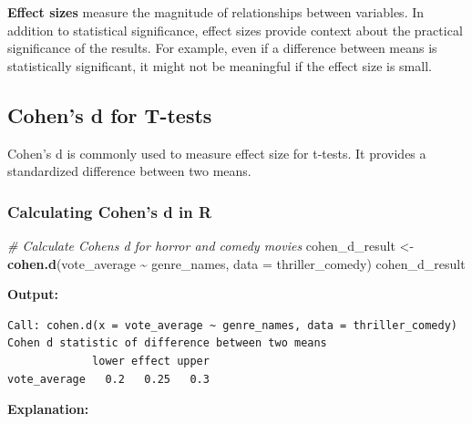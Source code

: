 \documentclass[
]{book}
\newenvironment{Shaded}{\begin{snugshade}}{\end{snugshade}}
\newcommand{\AttributeTok}[1]{\textcolor[rgb]{0.13,0.29,0.53}{#1}}
\newcommand{\CommentTok}[1]{\textcolor[rgb]{0.56,0.35,0.01}{\textit{#1}}}
\newcommand{\FunctionTok}[1]{\textcolor[rgb]{0.13,0.29,0.53}{\textbf{#1}}}
\newcommand{\NormalTok}[1]{#1}
\newcommand{\OtherTok}[1]{\textcolor[rgb]{0.56,0.35,0.01}{#1}}
\newcommand{\SpecialCharTok}[1]{\textcolor[rgb]{0.81,0.36,0.00}{\textbf{#1}}}
\begin{document}
\textbf{Effect sizes} measure the magnitude of relationships between variables. In addition to statistical significance, effect sizes provide context about the practical significance of the results. For example, even if a difference between means is statistically significant, it might not be meaningful if the effect size is small.

\subsection*{Cohen's d for T-tests}\label{cohens-d-for-t-tests}

Cohen's d is commonly used to measure effect size for t-tests. It provides a standardized difference between two means.

\subsubsection*{Calculating Cohen's d in R}\label{calculating-cohens-d-in-r}

\begin{Shaded}
\begin{Highlighting}[]
\CommentTok{\# Calculate Cohen\textquotesingle{}s d for horror and comedy movies}
\NormalTok{cohen\_d\_result }\OtherTok{\textless{}{-}} \FunctionTok{cohen.d}\NormalTok{(vote\_average }\SpecialCharTok{\textasciitilde{}}\NormalTok{ genre\_names, }\AttributeTok{data =}\NormalTok{ thriller\_comedy)}
\NormalTok{cohen\_d\_result}
\end{Highlighting}
\end{Shaded}

\textbf{Output:}

\begin{verbatim}
Call: cohen.d(x = vote_average ~ genre_names, data = thriller_comedy)
Cohen d statistic of difference between two means
             lower effect upper
vote_average   0.2   0.25   0.3
\end{verbatim}

\textbf{Explanation:}
\end{document}
